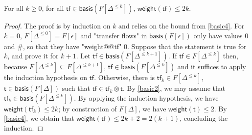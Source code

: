\documentclass[10pt,a4paper]{article}
\renewcommand{\geq}{\geqslant}
\renewcommand{\leq}{\leqslant}
\newcommand{\transitions}{\Delta}
\newcommand*{\dummysymb}{\#}
\newcommand*{\tfweight}[1]{\mathsf{weight}(#1)}
\newcommand*{\minwqo}[1]{\mathsf{basis}(#1)}
\newcommand*{\transfersof}[1]{F[#1]}
\newcommand*{\atf}{\mathsf{tf}}
\newcommand*{\tftimes}{\otimes}
\newcommand*{\emptysequence}{\epsilon}
\newcommand{\Tleq}[1]{\transfersof{\transitions^{\leq #1}}}
\newcommand{\T}{\transfersof{\transitions}}
\newcommand*{\neutraltransferflows}{\transfersof{\emptysequence}}
\newcommand*{\tftrans}{\mathsf{t}}
\newcommand*{\Tmin}{\minwqo{\T}}
\newcommand*{\maxweight}{2}
\begin{document}
\begin{toappendix}
	\begin{lemma}
		\label{bound-minwqo-Tleqk}
		For all \(k \geq 0\), for all \(\atf \in \minwqo{\Tleq{k}}\), \(\tfweight{\atf} \leq 2 k\).
	\end{lemma}
	\begin{proof}
		The proof is by induction on \(k\) and relies on the bound from \ref{basic4}.
		For \(k=0\), \(\Tleq{0} = \neutraltransferflows\) and "transfer flows" in \(\minwqo{\neutraltransferflows}\) only have values \(0\) and \(\dummysymb\), so that they have "weight@@tf" \(0\).
		Suppose that the statement is true for \(k\), and prove it for \(k+1\).
		Let \(\atf \in \minwqo{\Tleq{k+1}}\).
		If \(\atf \in \Tleq{k}\) then, because \(\Tleq{k} \subseteq \Tleq{k+1}\), \(\atf \in \minwqo{\Tleq{k}}\) and it suffices to apply the induction hypothesis on \(\atf\).
		Otherwise, there is \(\atf_k \in \Tleq{k}\), \(\tftrans \in \Tmin\) such that \(\atf \in \atf_k \tftimes \tftrans\).
		By \ref{basic2}, we may assume that \(\atf_k \in \minwqo{\Tleq{k}}\).
		By applying the induction hypothesis, we have \(\tfweight{\atf_k} \leq \maxweight k\); by construction of \(\T\), we have \(\tfweight{\tftrans} \leq \maxweight\).
		By \ref{basic4}, we obtain that \(\tfweight{\atf} \leq \maxweight k + \maxweight = \maxweight(k+1)\), concluding the induction.
	\end{proof}
\end{toappendix}
\end{document}

